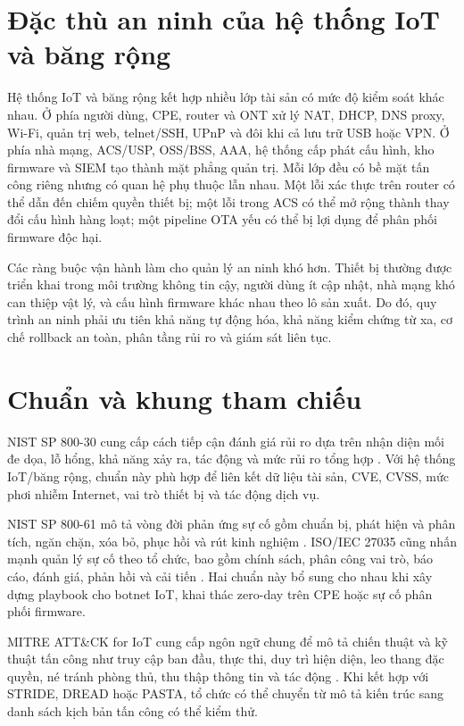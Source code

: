 \documentclass[../DoAn.tex]{subfiles}
\begin{document}
\section{Đặc thù an ninh của hệ thống IoT và băng rộng}
Hệ thống IoT và băng rộng kết hợp nhiều lớp tài sản có mức độ kiểm soát khác nhau. Ở phía người dùng, CPE, router và ONT xử lý NAT, DHCP, DNS proxy, Wi-Fi, quản trị web, telnet/SSH, UPnP và đôi khi cả lưu trữ USB hoặc VPN. Ở phía nhà mạng, ACS/USP, OSS/BSS, AAA, hệ thống cấp phát cấu hình, kho firmware và SIEM tạo thành mặt phẳng quản trị. Mỗi lớp đều có bề mặt tấn công riêng nhưng có quan hệ phụ thuộc lẫn nhau. Một lỗi xác thực trên router có thể dẫn đến chiếm quyền thiết bị; một lỗi trong ACS có thể mở rộng thành thay đổi cấu hình hàng loạt; một pipeline OTA yếu có thể bị lợi dụng để phân phối firmware độc hại.

Các ràng buộc vận hành làm cho quản lý an ninh khó hơn. Thiết bị thường được triển khai trong môi trường không tin cậy, người dùng ít cập nhật, nhà mạng khó can thiệp vật lý, và cấu hình firmware khác nhau theo lô sản xuất. Do đó, quy trình an ninh phải ưu tiên khả năng tự động hóa, khả năng kiểm chứng từ xa, cơ chế rollback an toàn, phân tầng rủi ro và giám sát liên tục.

\section{Chuẩn và khung tham chiếu}
NIST SP 800-30 cung cấp cách tiếp cận đánh giá rủi ro dựa trên nhận diện mối đe dọa, lỗ hổng, khả năng xảy ra, tác động và mức rủi ro tổng hợp \cite{nist80030}. Với hệ thống IoT/băng rộng, chuẩn này phù hợp để liên kết dữ liệu tài sản, CVE, CVSS, mức phơi nhiễm Internet, vai trò thiết bị và tác động dịch vụ.

NIST SP 800-61 mô tả vòng đời phản ứng sự cố gồm chuẩn bị, phát hiện và phân tích, ngăn chặn, xóa bỏ, phục hồi và rút kinh nghiệm \cite{nist80061}. ISO/IEC 27035 cũng nhấn mạnh quản lý sự cố theo tổ chức, bao gồm chính sách, phân công vai trò, báo cáo, đánh giá, phản hồi và cải tiến \cite{iso27035}. Hai chuẩn này bổ sung cho nhau khi xây dựng playbook cho botnet IoT, khai thác zero-day trên CPE hoặc sự cố phân phối firmware.

MITRE ATT\&CK for IoT cung cấp ngôn ngữ chung để mô tả chiến thuật và kỹ thuật tấn công như truy cập ban đầu, thực thi, duy trì hiện diện, leo thang đặc quyền, né tránh phòng thủ, thu thập thông tin và tác động \cite{mitreattackiot}. Khi kết hợp với STRIDE, DREAD hoặc PASTA, tổ chức có thể chuyển từ mô tả kiến trúc sang danh sách kịch bản tấn công có thể kiểm thử.
\end{document}
